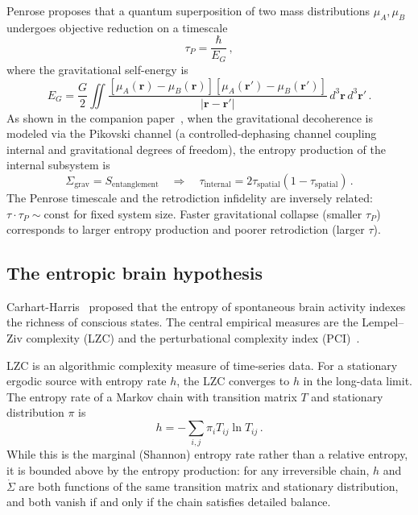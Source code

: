 \documentclass[prl,twocolumn,superscriptaddress,longbibliography,floatfix]{revtex4-2}
\newcommand{\tauasym}{\tau}
\begin{document}
Penrose proposes that a quantum superposition of two mass
distributions $\mu_A,\mu_B$ undergoes objective reduction on a
timescale~\cite{Penrose1996}
\begin{equation}
\tau_P = \frac{\hbar}{E_G}\,,
\label{eq:penrose_tau}
\end{equation}
where the gravitational self-energy is
\begin{equation}
E_G = \frac{G}{2}\!\iint\!
\frac{[\mu_A(\mathbf{r})-\mu_B(\mathbf{r})]
[\mu_A(\mathbf{r}')-\mu_B(\mathbf{r}')]}
{|\mathbf{r}-\mathbf{r}'|}\,
d^3\mathbf{r}\,d^3\mathbf{r}'\,.
\label{eq:EG}
\end{equation}
As shown in the companion paper~\cite{HuangPaper1b}, when the
gravitational decoherence is modeled via the Pikovski channel
(a controlled-dephasing channel coupling internal and gravitational
degrees of freedom), the entropy production of the internal
subsystem is
\begin{equation}
\Sigma_{\mathrm{grav}} = S_{\mathrm{entanglement}}
\quad\Longrightarrow\quad
\tauasym_{\mathrm{internal}} = 2\tauasym_{\mathrm{spatial}}
(1-\tauasym_{\mathrm{spatial}})\,.
\end{equation}
The Penrose timescale and the retrodiction infidelity are inversely
related: $\tauasym\cdot\tau_P \sim \mathrm{const}$ for fixed system
size.  Faster gravitational collapse (smaller $\tau_P$) corresponds
to larger entropy production and poorer retrodiction (larger
$\tauasym$).

\subsection{The entropic brain hypothesis}
\label{subsec:entropic_brain}

Carhart-Harris~\cite{CarhartHarris2014,CarhartHarris2018} proposed
that the entropy of spontaneous brain activity indexes the richness
of conscious states.  The central empirical measures are the
Lempel--Ziv complexity (LZC) and the perturbational complexity
index (PCI)~\cite{Casali2013,Schartner2017}.

LZC is an algorithmic complexity measure of time-series data.  For
a stationary ergodic source with entropy rate $h$, the LZC converges
to $h$ in the long-data limit.  The entropy rate of a Markov chain
with transition matrix $T$ and stationary distribution $\pi$ is
\begin{equation}
h = -\sum_{i,j}\pi_i T_{ij}\ln T_{ij}\,.
\end{equation}
While this is the marginal (Shannon) entropy rate rather than a
relative entropy, it is bounded above by the entropy production:
for any irreversible chain, $h$ and $\dot{\Sigma}$ are both functions
of the same transition matrix and stationary distribution, and both
vanish if and only if the chain satisfies detailed balance.
\end{document}
